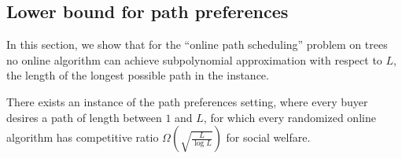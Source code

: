 \subsection{Lower bound for path preferences}
\label{sec:pathlowerbound}
In this section, we show that for the ``online path scheduling''
problem on trees no online algorithm can achieve subpolynomial
approximation with respect to $L$, the length of the longest possible
path in the instance. 

\begin{theorem}
    \label{thm:treelowerbound}
    There exists an instance of the path preferences setting, where
    every buyer desires a path of length between $1$ and $L$, for
    which every randomized online algorithm has competitive ratio
    $\Omega\left(\sqrt{\frac{L}{\log L}}\right)$ for social welfare.
\end{theorem}

